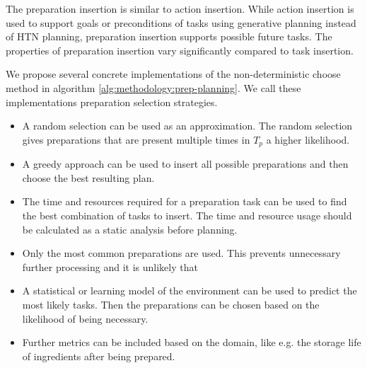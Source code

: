 The preparation insertion is similar to action insertion.
While action insertion is used to support goals or preconditions of tasks using generative planning instead of HTN planning, preparation insertion supports possible future tasks.
The properties of preparation insertion vary significantly compared to task insertion.


We propose several concrete implementations of the non-deterministic choose method in algorithm \ref{alg:methodology:prep-planning}.
We call these implementations preparation selection strategies.

\begin{itemize}
  \item A random selection can be used as an approximation.
    The random selection gives preparations that are present multiple times in $T_p$ a higher likelihood.
  \item A greedy approach can be used to insert all possible preparations and then choose the best resulting plan.
  \item The time and resources required for a preparation task can be used to find the best combination of tasks to insert.
  The time and resource usage should be calculated as a static analysis before planning.
  \item Only the most common preparations are used.
    This prevents unnecessary further processing and it is unlikely that 
  \item A statistical or learning model of the environment can be used to predict the most likely tasks.
    Then the preparations can be chosen based on the likelihood of being necessary.
  \item Further metrics can be included based on the domain, like e.g. the storage life of ingredients after being prepared.
\end{itemize}
